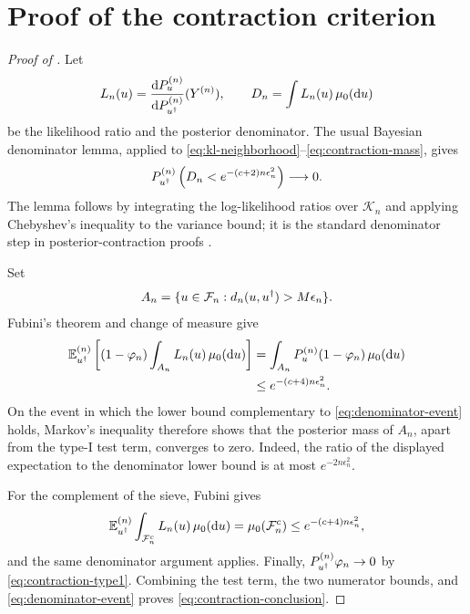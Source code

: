 \section{Proof of the contraction criterion}
\label{sec:appendix-contraction}

\begin{proof}[Proof of ]
Let
\[
  L_n(u)
  =\frac{\mathrm dP_u^{(n)}}{\mathrm dP_{{u^{\dagger}}}^{(n)}}
      (Y^{(n)}),
  \qquad
  D_n=\int L_n(u)\,{\mu_{0}}(\mathrm du)
\]
be the likelihood ratio and the posterior denominator.  The usual
Bayesian denominator lemma, applied to
\eqref{eq:kl-neighborhood}--\eqref{eq:contraction-mass}, gives
\begin{equation}
  P_{{u^{\dagger}}}^{(n)}
  \left(
    D_n<e^{-(c+2)n\epsilon_n^2}
  \right)\longrightarrow0 .
  \label{eq:denominator-event}
\end{equation}
The lemma follows by integrating the log-likelihood ratios over
$\mathcal K_n$ and applying Chebyshev's inequality to the variance
bound; it is the standard denominator step in posterior-contraction
proofs \citep[Chapter~8]{ghosal2017}.

Set
\[
  A_n
  =\{u\in\mathcal F_n:d_n(u,{u^{\dagger}})>M\epsilon_n\}.
\]
Fubini's theorem and change of measure give
\begin{align*}
  \mathbb E_{{u^{\dagger}}}^{(n)}
  \left[
    (1-\varphi_n)\int_{A_n}L_n(u)\,{\mu_{0}}(\mathrm du)
  \right]
  &=
  \int_{A_n}P_u^{(n)}(1-\varphi_n)\,{\mu_{0}}(\mathrm du)\\
  &\leq e^{-(c+4)n\epsilon_n^2}.
\end{align*}
On the event in which the lower bound complementary to
\eqref{eq:denominator-event} holds, Markov's inequality therefore
shows that the posterior mass of $A_n$, apart from the type-I test
term, converges to zero.  Indeed, the ratio of the displayed
expectation to the denominator lower bound is at most
$e^{-2n\epsilon_n^2}$.

For the complement of the sieve, Fubini gives
\[
  \mathbb E_{{u^{\dagger}}}^{(n)}
  \int_{\mathcal F_n^c}L_n(u)\,{\mu_{0}}(\mathrm du)
  ={\mu_{0}}(\mathcal F_n^c)
  \leq e^{-(c+4)n\epsilon_n^2},
\]
and the same denominator argument applies.  Finally,
$P_{{u^{\dagger}}}^{(n)}\varphi_n\to0$ by
\eqref{eq:contraction-type1}.  Combining the test term, the two
numerator bounds, and \eqref{eq:denominator-event} proves
\eqref{eq:contraction-conclusion}.
\end{proof}
